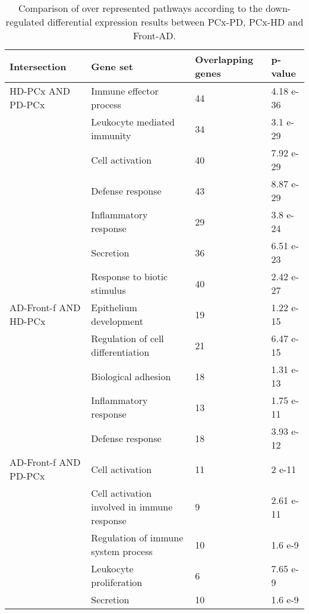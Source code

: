 \begin{table}[!ht]
\tiny
\centering
\caption{Comparison of over represented pathways according to the down-regulated differential expression results between PCx-PD, PCx-HD and Front-AD.}
\begin{tabularx}{13cm}{L{2cm}L{4.5cm}L{3cm}C{1.5cm}}
\toprule
\textbf{Intersection} & \textbf{Gene set} & \textbf{Overlapping genes} & \textbf{p-value} \\
\midrule
HD-PCx AND PD-PCx     & Immune effector process                       & 44  & 4.18 e-36  \\
                      & Leukocyte mediated immunity                 & 34  & 3.1 e-29   \\
                      & Cell activation                             & 40  & 7.92 e-29  \\
                      & Defense response                            & 43  & 8.87 e-29  \\
                      & Inflammatory response                         & 29  & 3.8 e-24   \\
                      & Secretion                                     & 36  & 6.51 e-23  \\
                      & Response to biotic stimulus                 & 40  & 2.42 e-27  \\
AD-Front-f AND HD-PCx & Epithelium development                      & 19  & 1.22 e-15  \\
                      & Regulation of cell differentiation          & 21  & 6.47 e-15  \\
                      & Biological adhesion                         & 18  & 1.31 e-13  \\
                      & Inflammatory response                         & 13  & 1.75 e-11  \\
                      & Defense response                            & 18  & 3.93 e-12  \\
AD-Front-f AND PD-PCx & Cell activation                               & 11  & 2 e-11     \\
                      & Cell activation involved in immune response & 9   & 2.61 e-11  \\
                      & Regulation of immune system process         & 10  & 1.6 e-9    \\
                      & Leukocyte proliferation                     & 6   & 7.65 e-9   \\
                      & Secretion                                     & 10  & 1.6 e-9    \\

\end{tabularx}
\end{table}
